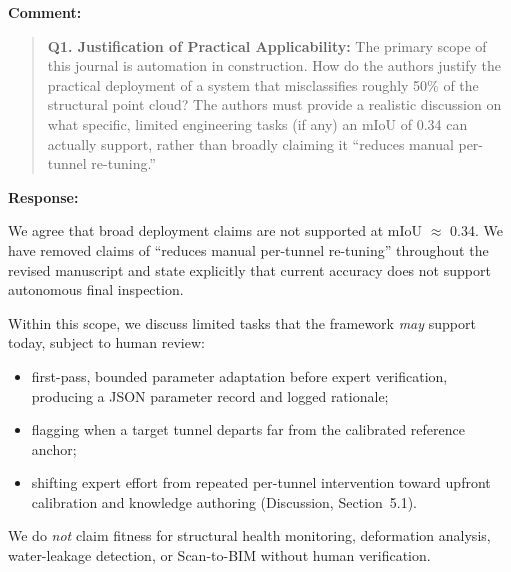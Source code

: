 \documentclass[11pt,a4paper]{article}
\newenvironment{commentblock}{%
  \par\smallskip\noindent\textbf{Comment:}\par
  \begin{quote}\itshape\color{black}
}{%
  \end{quote}\smallskip
}
\newenvironment{responseblock}{%
  \par\smallskip\noindent\textbf{Response:}\par
  \begingroup\color{responsegreen}
}{%
  \endgroup\smallskip
}
\begin{document}
\begin{commentblock}
\textbf{Q1. Justification of Practical Applicability:} The primary scope of this journal is automation in construction. How do the authors justify the practical deployment of a system that misclassifies roughly 50\% of the structural point cloud? The authors must provide a realistic discussion on what specific, limited engineering tasks (if any) an mIoU of 0.34 can actually support, rather than broadly claiming it ``reduces manual per-tunnel re-tuning.''
\end{commentblock}
\begin{responseblock}
We agree that broad deployment claims are not supported at mIoU $\approx$ 0.34. We have removed claims of ``reduces manual per-tunnel re-tuning'' throughout the revised manuscript and state explicitly that current accuracy does not support autonomous final inspection.

Within this scope, we discuss limited tasks that the framework \emph{may} support today, subject to human review:
\begin{itemize}[nosep]
  \item first-pass, bounded parameter adaptation before expert verification, producing a JSON parameter record and logged rationale;
  \item flagging when a target tunnel departs far from the calibrated reference anchor;
  \item shifting expert effort from repeated per-tunnel intervention toward upfront calibration and knowledge authoring (Discussion, Section~5.1).
\end{itemize}
We do \emph{not} claim fitness for structural health monitoring, deformation analysis, water-leakage detection, or Scan-to-BIM without human verification.
\end{responseblock}
\end{document}
